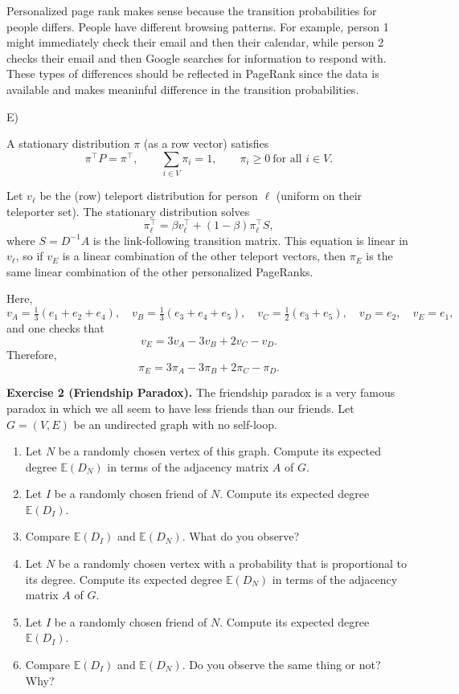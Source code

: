 \documentclass{article}
\begin{document}
\begin{tcolorbox}
Personalized page rank makes sense because the transition probabilities for people differs. People have different browsing patterns. For example, person 1 might immediately check their email and then their calendar, while person 2 checks their email and then Google searches for information to respond with. These types of differences should be reflected in PageRank since the data is available and makes meaninful difference in the transition probabilities. 

E)

A stationary distribution $\pi$ (as a row vector) satisfies
\[
\pi^\top P = \pi^\top,
\qquad \sum_{i\in V}\pi_i = 1,
\qquad \pi_i\ge 0\ \text{for all }i\in V.
\]

Let $v_\ell$ be the (row) teleport distribution for person $\ell$ (uniform on their teleporter set). The stationary distribution solves
\[
\pi_\ell^\top = \beta v_\ell^\top + (1-\beta)\pi_\ell^\top S,
\]
where $S=D^{-1}A$ is the link-following transition matrix. This equation is linear in $v_\ell$, so if $v_E$ is a linear combination of the other teleport vectors, then $\pi_E$ is the same linear combination of the other personalized PageRanks.

Here,
\[
v_A=\tfrac13(e_1+e_2+e_4),\quad
v_B=\tfrac13(e_3+e_4+e_5),\quad
v_C=\tfrac12(e_3+e_5),\quad
v_D=e_2,\quad
v_E=e_1,
\]
and one checks that
\[
v_E = 3v_A - 3v_B + 2v_C - v_D.
\]
Therefore,
\[
\pi_E = 3\pi_A - 3\pi_B + 2\pi_C - \pi_D.
\]





\end{tcolorbox}
\vspace{12pt}

\begin{tcolorbox}[colback = gray!16, enhanced, boxrule=0pt, frame hidden, sharp corners, borderline west={3pt}{-1.5pt}{black!80},breakable]
\textbf{Exercise 2 (Friendship Paradox).} The friendship paradox is a very famous paradox in which we all seem to have less friends than our friends. Let $G=(V,E)$ be an undirected graph with no self-loop.
\begin{enumerate}[$(a)$]
    \item Let $N$ be a randomly chosen vertex of this graph. Compute its expected degree $\mathbb{E}(D_N)$ in terms of the adjacency matrix $A$ of $G$.
    \item Let $I$ be a randomly chosen friend of $N$. Compute its expected degree $\mathbb{E}(D_I)$.
    \item Compare $\mathbb{E}(D_I)$ and $\mathbb{E}(D_N)$. What do you observe?
    \item Let $N$ be a randomly chosen vertex with a probability that is proportional to its degree. Compute its expected degree $\mathbb{E}(D_N)$ in terms of the adjacency matrix $A$ of $G$.
    \item Let $I$ be a randomly chosen friend of $N$. Compute its expected degree $\mathbb{E}(D_I)$.
    \item Compare $\mathbb{E}(D_I)$ and $\mathbb{E}(D_N)$. Do you observe the same thing or not? Why?
\end{enumerate}


\end{tcolorbox}
\end{document}
